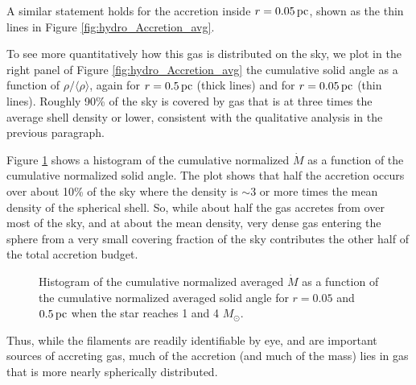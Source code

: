 \documentclass[../dissertation.tex]{subfiles}
\begin{document}
A similar statement holds for the accretion inside $r=0.05\,\rm pc$, shown as the thin lines in Figure 
\ref{fig:hydro_Accretion_avg}.

To see more quantitatively how this gas is distributed on the sky,
we plot in the right panel of Figure \ref{fig:hydro_Accretion_avg} the cumulative solid 
angle as a function of $\rho/\langle \rho\rangle$, again for $r=0.5\,\rm pc$ (thick lines) 
and for $r=0.05\,\rm pc$ (thin lines).  Roughly 90\% of the sky is
covered by gas that is at three times the average shell density or lower, 
consistent with the qualitative analysis in the previous paragraph. 

Figure 
\ref{fig:hydro_Accretion_angle_avg} shows a histogram of the cumulative normalized 
$\dot{M}$ as a function of the cumulative normalized solid angle.  
The plot shows that half the accretion occurs over about 10\% of the sky 
where the density is $\sim3$ or more times the mean density of the spherical shell.  
So, while about half the gas accretes from over most of the sky, and at about the mean density,
very dense gas entering the sphere from a very small covering fraction of the sky contributes the other half of the total accretion budget. 
%
\begin{figure}[htb]%
\caption[Hydro Non-filamentary accretion]{Histogram of the cumulative normalized averaged $\dot{M}$ as a function of the cumulative normalized averaged solid angle for $r=0.05$ and $0.5\,\rm pc$ when the star reaches 1 and 4 
$M_{\odot}$. \label{fig:hydro_Accretion_angle_avg}}
\end{figure}

Thus, while the filaments are readily identifiable by eye, and are important sources 
of accreting gas, much of the accretion (and much of the mass) lies in gas that 
is more nearly spherically distributed. 

\end{document}
